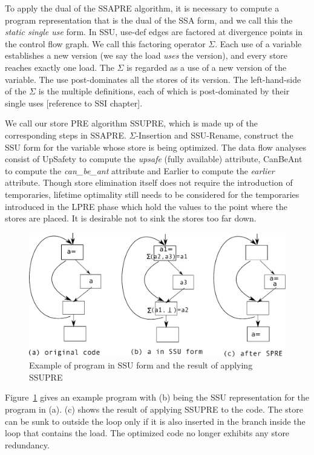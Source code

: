 To apply the dual of the SSAPRE algorithm, it is necessary to compute a program
representation that is the dual of the SSA form, and we call this the 
\emph{static single use} form.  In SSU, use-def edges are factored at
divergence points in the control flow graph.  We call this factoring operator
$\Sigma$.  Each use of a variable establishes a new version (we say the load 
\emph{uses} the version), and every store reaches exactly one load.   The
$\Sigma$ is regarded as a use of a new version of the variable.  The use
post-dominates all the stores of its version.  The left-hand-side of the
$\Sigma$ is the multiple definitions, each of which is post-dominated by their
single uses [reference to SSI chapter].

We call our store PRE algorithm SSUPRE, which is made up of the corresponding 
steps in SSAPRE.   $\Sigma$-Insertion and
SSU-Rename, construct the SSU form for the variable whose store is being 
optimized.  The data flow analyses consist of UpSafety to compute the
\emph{upsafe} (fully available) attribute, CanBeAnt to compute the
\emph{can\_be\_ant} attribute and Earlier to compute the \emph{earlier}
attribute.  Though store elimination itself does not require
the introduction of temporaries, lifetime optimality still needs to be
considered for the temporaries introduced in the LPRE phase which hold the 
values to the point where the stores are placed.  It is desirable not 
to sink the stores too far down.  

\begin{figure}
\centering
\includegraphics[scale=0.55]{fig-ssupre.pdf}
\caption{Example of program in SSU form and the result of applying SSUPRE}
\label{fig: ssupre}
\end{figure}

Figure~\ref{fig: ssupre} gives an example program with (b) being the SSU 
representation for the program in (a).  
(c) shows the result of applying SSUPRE to the code.
The store can be sunk to outside the loop only if it is also inserted in
the branch inside the loop that contains the load.  The optimized code no
longer exhibits any store redundancy.


